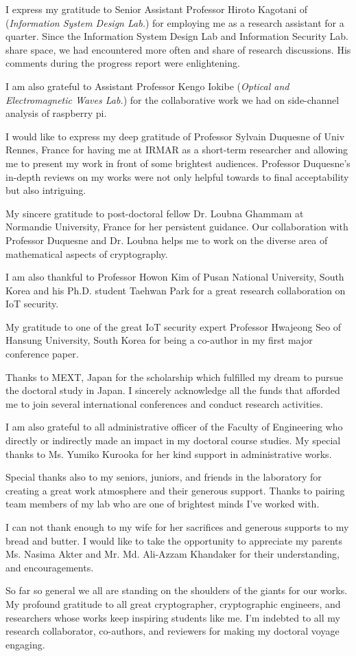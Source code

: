 I express my gratitude to Senior Assistant Professor Hiroto Kagotani of (\textit{Information System Design Lab.}) for employing me as a research assistant for a quarter. 
Since the Information System Design Lab and Information Security Lab. share space, we had encountered more often and share of research discussions.
His comments during the progress report were enlightening.


I am also grateful to Assistant Professor Kengo Iokibe (\textit{Optical and Electromagnetic Waves Lab.}) for the collaborative work we had on side-channel analysis of raspberry pi.


I would like to express my deep gratitude of Professor Sylvain Duquesne of  Univ  Rennes, France for having me at IRMAR as a short-term researcher and allowing me to present my work in front of some brightest audiences.
Professor Duquesne's in-depth reviews on my works were not only helpful towards to final acceptability but also intriguing.

My sincere gratitude to post-doctoral fellow Dr. Loubna Ghammam at Normandie University, France for her persistent guidance.
Our collaboration with  Professor Duquesne and Dr. Loubna helps me to work on the diverse area of mathematical aspects of cryptography.


I am also thankful to Professor Howon Kim of Pusan National University, South Korea and his Ph.D. student Taehwan Park for a great research collaboration on IoT security.

My gratitude to one of the great IoT security expert Professor Hwajeong Seo of Hansung University, South Korea for being a co-author in my first major conference paper.


Thanks to MEXT, Japan for the scholarship which fulfilled my dream to pursue the doctoral study in Japan.
I sincerely acknowledge all the funds that afforded me to join several international conferences and conduct research activities.


I am also grateful to all administrative officer of the Faculty of Engineering who directly or indirectly made an impact in my doctoral course studies. My special thanks to Ms. Yumiko Kurooka for her kind support in administrative works.


Special thanks also to my seniors, juniors, and friends in the laboratory for creating a great work atmosphere and their generous support.  
Thanks to pairing team members of my lab who are one of brightest minds I've worked with.

I can not thank enough to my wife for her sacrifices and generous supports to my bread and butter. 
I would like to take the opportunity to appreciate my parents Ms. Nasima Akter and Mr. Md. Ali-Azzam Khandaker for their understanding, and encouragements.


So far so general we all are standing on the shoulders of the giants for our works. 
My profound gratitude to all great cryptographer, cryptographic engineers, and researchers whose works keep inspiring students like me.
I'm indebted to all my research collaborator, co-authors, and reviewers for making my doctoral voyage engaging.
